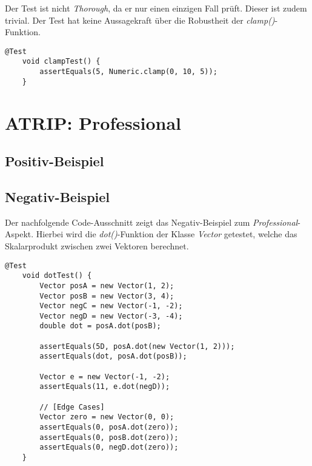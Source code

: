 Der Test ist nicht \textit{Thorough}, da er nur einen einzigen Fall
prüft. Dieser ist zudem trivial. Der Test hat keine Aussagekraft über
die Robustheit der \textit{clamp()}-Funktion.

\vspace{0.5cm}
\begin{lstlisting}[caption={ATRIP: Thorough / Negativ}]
    @Test
    void clampTest() {
        assertEquals(5, Numeric.clamp(0, 10, 5));
    }
\end{lstlisting}

\section{ATRIP: Professional}
\subsection*{Positiv-Beispiel}


\subsection*{Negativ-Beispiel}
Der nachfolgende Code-Ausschnitt zeigt das Negativ-Beispiel zum
\textit{Professional}-Aspekt. Hierbei wird die
\textit{dot()}-Funktion der Klasse
\textit{Vector} getestet, welche das Skalarprodukt zwischen zwei
Vektoren berechnet.

\vspace{0.5cm}
\begin{lstlisting}[caption={ATRIP: Thorough / Negativ}]
    @Test
    void dotTest() {
        Vector posA = new Vector(1, 2);
        Vector posB = new Vector(3, 4);
        Vector negC = new Vector(-1, -2);
        Vector negD = new Vector(-3, -4);
        double dot = posA.dot(posB);
        
        assertEquals(5D, posA.dot(new Vector(1, 2)));
        assertEquals(dot, posA.dot(posB));
        
        Vector e = new Vector(-1, -2);
        assertEquals(11, e.dot(negD));
        
        // [Edge Cases]
        Vector zero = new Vector(0, 0);
        assertEquals(0, posA.dot(zero));
        assertEquals(0, posB.dot(zero));
        assertEquals(0, negD.dot(zero));
    }
\end{lstlisting}

